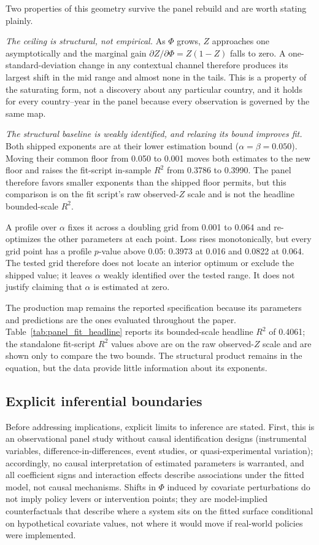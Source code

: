 \documentclass[11pt]{article}
\begin{document}
Two properties of this geometry survive the panel rebuild and are worth stating plainly.

\emph{The ceiling is structural, not empirical.} As $\Phi$ grows, $Z$ approaches one asymptotically and the marginal gain $\partial Z/\partial\Phi=Z(1-Z)$ falls to zero. A one-standard-deviation change in any contextual channel therefore produces its largest shift in the mid range and almost none in the tails. This is a property of the saturating form, not a discovery about any particular country, and it holds for every country--year in the panel because every observation is governed by the same map.

\emph{The structural baseline is weakly identified, and relaxing its bound improves fit.} Both shipped exponents are at their lower estimation bound ($\alpha=\beta=0.050$). Moving their common floor from \num{0.050} to \num{0.001} moves both estimates to the new floor and raises the fit-script in-sample $R^2$ from \num{0.3786} to \num{0.3990}. The panel therefore favors smaller exponents than the shipped floor permits, but this comparison is on the fit script's raw observed-$Z$ scale and is not the headline bounded-scale $R^2$.

A profile over $\alpha$ fixes it across a doubling grid from \num{0.001} to \num{0.064} and re-optimizes the other parameters at each point. Loss rises monotonically, but every grid point has a profile $p$-value above \num{0.05}: \num{0.3973} at \num{0.016} and \num{0.0822} at \num{0.064}. The tested grid therefore does not locate an interior optimum or exclude the shipped value; it leaves $\alpha$ weakly identified over the tested range. It does not justify claiming that $\alpha$ is estimated at zero.

The production map remains the reported specification because its parameters and predictions are the ones evaluated throughout the paper. Table~\ref{tab:panel_fit_headline} reports its bounded-scale headline $R^2$ of \num{0.4061}; the standalone fit-script $R^2$ values above are on the raw observed-$Z$ scale and are shown only to compare the two bounds. The structural product remains in the equation, but the data provide little information about its exponents.

\subsection*{Explicit inferential boundaries}

Before addressing implications, explicit limits to inference are stated. First, this is an observational panel study without causal identification designs (instrumental variables, difference-in-differences, event studies, or quasi-experimental variation); accordingly, no causal interpretation of estimated parameters is warranted, and all coefficient signs and interaction effects describe associations under the fitted model, not causal mechanisms. Shifts in $\Phi$ induced by covariate perturbations do not imply policy levers or intervention points; they are model-implied counterfactuals that describe where a system sits on the fitted surface conditional on hypothetical covariate values, not where it would move if real-world policies were implemented.
\end{document}
